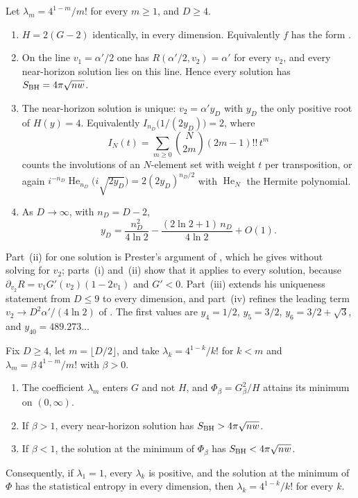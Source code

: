 \begin{theorem}\label{thm:prester}
Let $\lambda_m=4^{1-m}/m!$ for every $m\ge1$, and $D\ge4$.
\begin{enumerate}[label=(\roman*),leftmargin=2em]
\item $H=2(G-2)$ identically, in every dimension. Equivalently $f$ has the form \cite[Eq.~(5.3)]{Prester06}.
\item On the line $v_1=\alpha'/2$ one has $R(\alpha'/2,v_2)=\alpha'$ for every $v_2$, and every near-horizon solution lies on this line. Hence every solution has $S_{\rm BH}=4\pi\sqrt{nw}$.
\item The near-horizon solution is unique: $v_2=\alpha'y_D$ with $y_D$ the only positive root of $H(y)=4$. Equivalently $I_{n_D}\big(1/(2y_D)\big)=2$, where
\[
I_N(t)=\sum_{m\ge0}\binom{N}{2m}(2m-1)!!\,t^m
\]
counts the involutions of an $N$-element set with weight $t$ per transposition, or again $i^{-n_D}\operatorname{He}_{n_D}\big(i\sqrt{2y_D}\big)=2(2y_D)^{n_D/2}$ with $\operatorname{He}_N$ the Hermite polynomial.
\item As $D\to\infty$, with $n_D=D-2$,
\[
y_D=\frac{n_D^2}{4\ln2}-\frac{(2\ln2+1)\,n_D}{4\ln2}+O(1).
\]
\end{enumerate}
\end{theorem}

Part~(ii) for one solution is Prester's argument of \cite[Section~5]{Prester06}, which he gives without solving for $v_2$; parts~(i) and~(ii) show that it applies to every solution, because $\partial_{v_2}R=v_1G'(v_2)(1-2v_1)$ and $G'<0$. Part~(iii) extends his uniqueness statement from $D\le9$ to every dimension, and part~(iv) refines the leading term $v_2\to D^2\alpha'/(4\ln2)$ of \cite[Eq.~(20)]{Prester13}. The first values are $y_4=1/2$, $y_5=3/2$, $y_6=3/2+\sqrt3$, and $y_{40}=489.273\dots$

\begin{theorem}\label{thm:rigidity}
Fix $D\ge4$, let $m=\lfloor D/2\rfloor$, and take $\lambda_k=4^{1-k}/k!$ for $k<m$ and $\lambda_m=\beta\,4^{1-m}/m!$ with $\beta>0$.
\begin{enumerate}[label=(\roman*),leftmargin=2em]
\item The coefficient $\lambda_m$ enters $G$ and not $H$, and $\Phi_\beta=G_\beta^2/H$ attains its minimum on $(0,\infty)$.
\item If $\beta>1$, every near-horizon solution has $S_{\rm BH}>4\pi\sqrt{nw}$.
\item If $\beta<1$, the solution at the minimum of $\Phi_\beta$ has $S_{\rm BH}<4\pi\sqrt{nw}$.
\end{enumerate}
Consequently, if $\lambda_1=1$, every $\lambda_k$ is positive, and the solution at the minimum of $\Phi$ has the statistical entropy in every dimension, then $\lambda_k=4^{1-k}/k!$ for every $k$.
\end{theorem}

